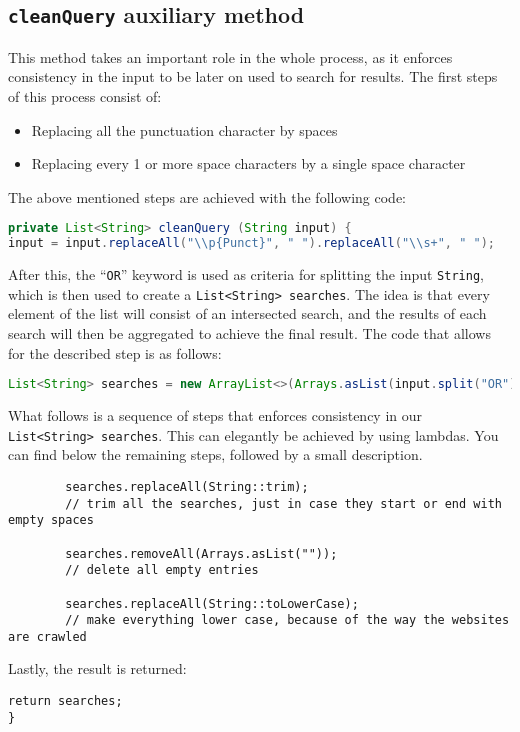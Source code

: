 \subsection{{\tt cleanQuery} auxiliary method}
This method takes an important role in the whole process, as it enforces consistency in the input to be later on used to search for results. The first steps of this process consist of:
\begin{itemize}
\item Replacing all the punctuation character by spaces
\item Replacing every 1 or more space characters by a single space character
\end{itemize}
The above mentioned steps are achieved with the following code:
\begin{lstlisting}[language=Java]
private List<String> cleanQuery (String input) {
input = input.replaceAll("\\p{Punct}", " ").replaceAll("\\s+", " ");
\end{lstlisting}
After this, the ``{\tt OR}'' keyword is used as criteria for splitting the input {\tt String}, which is then used to create a {\tt List<String> searches}. The idea is that every element of the list will consist of an intersected search, and the results of each search will then be aggregated to achieve the final result. The code that allows for the described step is as follows:
\begin{lstlisting}[language=Java]
List<String> searches = new ArrayList<>(Arrays.asList(input.split("OR")));
\end{lstlisting}
What follows is a sequence of steps that enforces consistency in our {\tt List<String> searches}. This can elegantly be achieved by using lambdas. You can find below the remaining steps, followed by a small description.
\begin{lstlisting}
        searches.replaceAll(String::trim);
        // trim all the searches, just in case they start or end with empty spaces

        searches.removeAll(Arrays.asList(""));
        // delete all empty entries

        searches.replaceAll(String::toLowerCase);
        // make everything lower case, because of the way the websites are crawled
\end{lstlisting}
Lastly, the result is returned:
\begin{lstlisting}
return searches;
}
\end{lstlisting}
